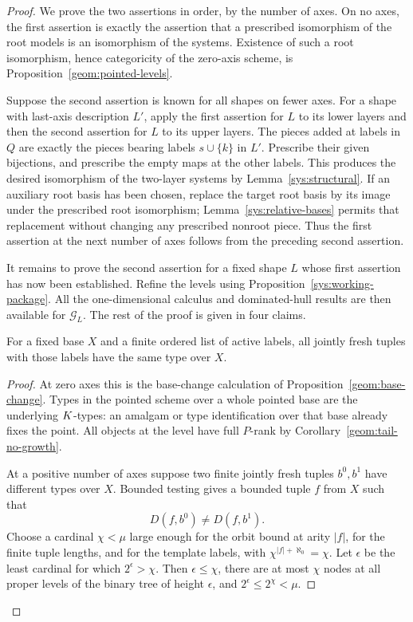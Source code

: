 \begin{proof}
We prove the two assertions in order, by the number of axes.
On no axes, the first assertion is exactly the assertion that a
prescribed isomorphism of the root models is an isomorphism of the
systems.  Existence of such a root isomorphism, hence categoricity
of the zero-axis scheme, is
Proposition~\ref{geom:pointed-levels}.

Suppose the second assertion is known for all shapes on fewer
axes.  For a shape with last-axis description $L'$, apply the first
assertion for $L$ to its lower layers and then the second assertion
for $L$ to its upper layers.  The pieces added at labels in $Q$
are exactly the pieces bearing labels $s\cup\{k\}$ in $L'$.
Prescribe their given bijections, and prescribe the empty maps at
the other labels.  This produces the desired isomorphism of the
two-layer systems by Lemma~\ref{sys:structural}.
If an auxiliary root basis has been chosen, replace the target
root basis by its image under the prescribed root isomorphism;
Lemma~\ref{sys:relative-bases} permits that replacement without
changing any prescribed nonroot piece.  Thus the first assertion
at the next number of axes follows from the preceding second
assertion.

It remains to prove the second assertion for a fixed shape $L$
whose first assertion has now been established.  Refine the
levels using Proposition~\ref{sys:working-package}.  All the
one-dimensional calculus and dominated-hull results are then
available for $\mathcal G_L$.  The rest of the proof is given in
four claims.

\begin{claim}
\label{sys:finite-fresh-types}
For a fixed base $X$ and a finite ordered list of active labels,
all jointly fresh tuples with those labels have the same type
over $X$.
\end{claim}

\begin{proof}
At zero axes this is the base-change calculation of
Proposition~\ref{geom:base-change}.  Types in the pointed scheme
over a whole pointed base are the underlying $K$-types: an
amalgam or type identification over that base already fixes the
point.  All objects at the level have full $P$-rank by
Corollary~\ref{geom:tail-no-growth}.

At a positive number of axes suppose two finite jointly fresh
tuples $b^0,b^1$ have different types over $X$.  Bounded testing
gives a bounded tuple $f$ from $X$ such that
\[
 D(f,b^0)\ne D(f,b^1).
\]
Choose a cardinal $\chi<\mu$ large enough for the orbit bound at
arity $|f|$, for the finite tuple lengths, and for the template
labels, with $\chi^{|f|+\aleph_0}=\chi$.  Let $\epsilon$ be the
least cardinal for which $2^\epsilon>\chi$.  Then
$\epsilon\leq\chi$, there are at most $\chi$ nodes at all proper
levels of the binary tree of height $\epsilon$, and
$2^\epsilon\leq2^\chi<\mu$.


\end{proof}
\end{proof}
